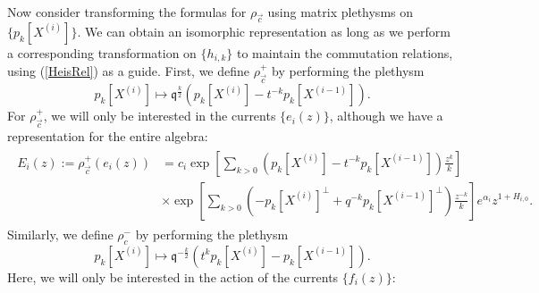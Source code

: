 \documentclass{amsart}
\newcommand{\qqq}{\mathfrak{q}}
\theoremstyle{remark}
\numberwithin{thm}{section}
\numberwithin{equation}{section}
\begin{document}
Now consider transforming the formulas for $\rho_{\vec{c}}$ using matrix plethysms on $\{p_k[X^{(i)}]\}$.
We can obtain an isomorphic representation as long as we perform a corresponding transformation on $\{h_{i,k}\}$ to maintain the commutation relations, using (\ref{HeisRel}) as a guide.
First, we define $\rho_{\vec{c}}^+$ by performing the plethysm
\[
p_k[X^{(i)}]\mapsto \qqq^{\frac{k}{2}}\left(p_k[X^{(i)}]-t^{-k}p_k[X^{(i-1)}]\right).
\]
For $\rho_{\vec{c}}^+$, we will only be interested in the currents $\{e_i(z)\}$, although we have a representation for the entire algebra:
\begin{align}
\label{ECurrentDef}
\begin{split}
E_i(z):=\rho_{\vec{c}}^+(e_i(z))&=c_i\exp\left[\sum_{k>0}\left(p_{k}[X^{(i)}]-t^{-k}p_{k}[X^{(i-1)}]\right)\frac{z^k}{k}\right]\\
&\times\exp\left[\sum_{k>0}\left(-p_{k}[X^{(i)}]^\perp+q^{-k}p_k[X^{(i-1)}]^\perp\right)\frac{z^{-k}}{k}\right]e^{\alpha_i} z^{1+H_{i,0}}.
\end{split}
\end{align}
Similarly, we define $\rho_{c}^-$ by performing the plethysm
\[
p_k[X^{(i)}]\mapsto \qqq^{-\frac{k}{2}}\left(t^{k}p_k[X^{(i)}]-p_k[X^{(i-1)}]\right).
\]
Here, we will only be interested in the action of the currents $\{ f_i(z)\}$:
\end{document}
